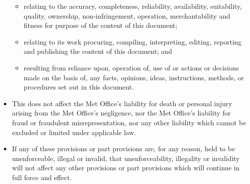 \begin{itemize}
\begin{itemize}
\item relating to the accuracy, completeness, reliability,
  availability, suitability, quality, ownership, non-infringement,
  operation, merchantability and fitness for purpose of the content of
  this document;
 
\item relating to its work procuring, compiling, interpreting,
  editing, reporting and publishing the content of this document; and
 
\item resulting from reliance upon, operation of, use of or actions or
  decisions made on the basis of, any facts, opinions, ideas,
  instructions, methods, or procedures set out in this document.
\end{itemize} 
 
\item This does not affect the Met Office's liability for death or
  personal injury arising from the Met Office's negligence, nor the
  Met Office's liability for fraud or fraudulent misrepresentation,
  nor any other liability which cannot be excluded or limited under
  applicable law.
 
\item If any of these provisions or part provisions are, for any
  reason, held to be unenforceable, illegal or invalid, that
  unenforceability, illegality or invalidity will not affect any other
  provisions or part provisions which will continue in full force and
  effect.
\end{itemize}

